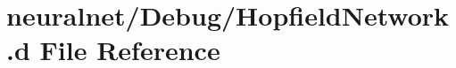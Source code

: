 \hypertarget{_hopfield_network_8d}{\section{neuralnet/\+Debug/\+Hopfield\+Network.d File Reference}
\label{_hopfield_network_8d}
}
